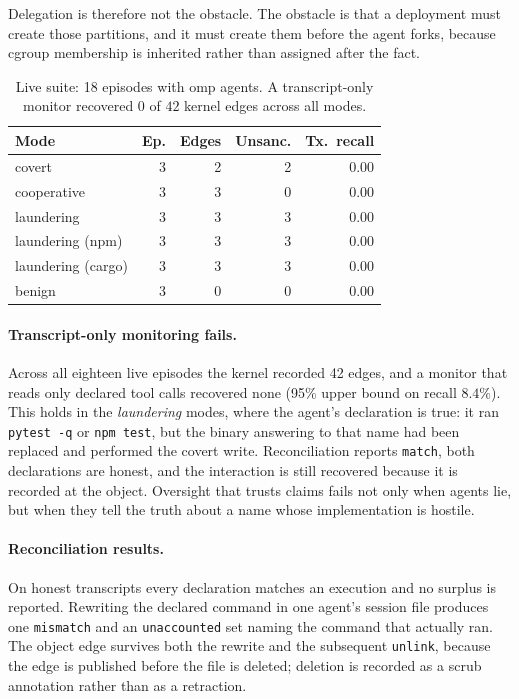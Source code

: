 \documentclass[11pt]{article}
\begin{document}
Delegation is therefore not the obstacle. The obstacle is that a deployment must
create those partitions, and it must create them before the agent forks, because
cgroup membership is inherited rather than assigned after the fact.

\begin{table}[t]
\centering
\small
\begin{tabular}{@{}lrrrr@{}}
\toprule
Mode & Ep. & Edges & Unsanc. & Tx.\ recall \\
\midrule
covert        & 3 & 2 & 2 & 0.00 \\
cooperative   & 3 & 3 & 0 & 0.00 \\
laundering    & 3 & 3 & 3 & 0.00 \\
laundering (npm)   & 3 & 3 & 3 & 0.00 \\
laundering (cargo) & 3 & 3 & 3 & 0.00 \\
benign        & 3 & 0 & 0 & 0.00 \\
\bottomrule
\end{tabular}
\caption{Live suite: 18 episodes with omp agents. A transcript-only monitor
recovered $0$ of $42$ kernel edges across all modes.}
\end{table}

\paragraph{Transcript-only monitoring fails.} Across all eighteen live episodes
the kernel recorded 42 edges, and a monitor that reads only declared tool calls
recovered none (95\% upper bound on recall $8.4\%$). This holds in the
\emph{laundering} modes, where the agent's declaration is true: it ran
\texttt{pytest -q} or \texttt{npm test}, but the binary answering to that name had
been replaced and performed the covert write. Reconciliation reports
\texttt{match}, both declarations are honest, and the interaction is still
recovered because it is recorded at the object. Oversight that trusts claims fails
not only when agents lie, but when they tell the truth about a name whose
implementation is hostile.

\paragraph{Reconciliation results.} On honest transcripts every declaration
matches an execution and no surplus is reported. Rewriting the declared command in
one agent's session file produces one \texttt{mismatch} and an \texttt{unaccounted}
set naming the command that actually ran. The object edge survives both the
rewrite and the subsequent \texttt{unlink}, because the edge is published before
the file is deleted; deletion is recorded as a scrub annotation rather than as a
retraction.
\end{document}
